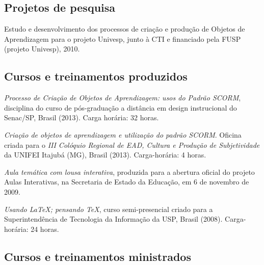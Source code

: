 \subsection{Projetos de pesquisa}

\begin{compactitem}
  \item Estudo e desenvolvimento dos processos de criação e produção de Objetos de Aprendizagem para o projeto Univesp, junto à CTI e financiado pela FUSP (projeto Univesp), 2010.
\end{compactitem}

\subsection{Cursos e treinamentos produzidos}

\begin{compactitem}
  \item \textsl{Processo de Criação de Objetos de Aprendizagem: usos do Padrão SCORM}, disciplina do curso de pós-graduação a distância em design instrucional do Senac/SP, Brasil (2013). Carga horária: 32 horas.
  \item \textsl{Criação de objetos de aprendizagem e utilização do padrão SCORM}. Oficina criada para o \textsl{III Colóquio Regional de EAD, Cultura e Produção de Subjetividade} da UNIFEI Itajubá (MG), Brasil (2013). Carga-horária: 4 horas.
  \item \textsl{Aula temática com lousa interativa}, produzida para a abertura oficial do projeto Aulas Interativas, na Secretaria de Estado da Educação, em 6 de novembro de 2009.
  \item \textsl{Usando \LaTeX; pensando \TeX}, curso semi-presencial criado para a Superintendência de Tecnologia da Informação da USP, Brasil (2008). Carga-horária: 24 horas.
\end{compactitem}

\subsection{Cursos e treinamentos ministrados}

